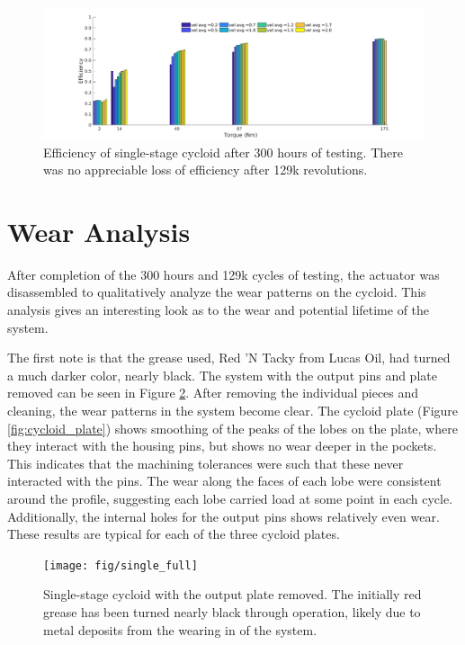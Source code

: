 \begin{figure}[!t]
   \centering
   \includegraphics[width=1.0\linewidth]{fig/eff_final}
   \caption{Efficiency of single-stage cycloid after 300 hours of testing. There was no appreciable loss of efficiency after 129k revolutions. }
   \label{fig:eff_results_final}
\end{figure}

\section{Wear Analysis} \label{ch:single:wear_analysis}

After completion of the 300 hours and 129k cycles of testing, the actuator was disassembled to qualitatively analyze the wear patterns on the cycloid. This analysis gives an interesting look as to the wear and potential lifetime of the system. 

The first note is that the grease used, Red 'N Tacky from Lucas Oil, had turned a much darker color, nearly black. The system with the output pins and plate removed can be seen in Figure \ref{fig:single_full}. After removing the individual pieces and cleaning, the wear patterns in the system become clear. The cycloid plate (Figure \ref{fig:cycloid_plate}) shows smoothing of the peaks of the lobes on the plate, where they interact with the housing pins, but shows no wear deeper in the pockets. This indicates that the machining tolerances were such that these never interacted with the pins. The wear along the faces of each lobe were consistent around the profile, suggesting each lobe carried load at some point in each cycle. Additionally, the internal holes for the output pins shows relatively even wear. These results are typical for each of the three cycloid plates. 

\begin{figure}[t]
   \centering
   \texttt{[image: fig/single\_full]}
   \caption{Single-stage cycloid with the output plate removed. The initially red grease has been turned nearly black through operation, likely due to metal deposits from the wearing in of the system.}
   \label{fig:single_full}
\end{figure}


